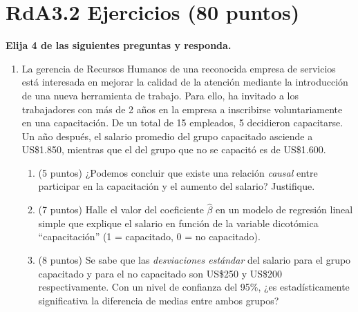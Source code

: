 \documentclass[10pt,a4paper]{article}
\begin{document}
\section{RdA3.2 Ejercicios (80 puntos)}
{\bf Elija 4 de las siguientes preguntas y responda.} 
\begin{enumerate}
  \item La gerencia de Recursos Humanos de una reconocida empresa de servicios está interesada en mejorar la calidad de la atención mediante la introducción de una nueva herramienta de trabajo. Para ello, ha invitado a los trabajadores con más de 2 años en la empresa a inscribirse voluntariamente en una capacitación. De un total de 15 empleados, 5 decidieron capacitarse. Un año después, el salario promedio del grupo capacitado asciende a US\$1.850, mientras que el del grupo que no se capacitó es de US\$1.600.
\begin{enumerate}
      \item  (5 puntos) ¿Podemos concluir que existe una relación \textit{causal} entre participar en la capacitación y el aumento del salario? Justifique.

    \item  (7 puntos) Halle el valor del coeficiente $\hat{\beta}$ en un modelo de regresión lineal simple que explique el salario en función de la variable dicotómica ``capacitación'' (1 = capacitado, 0 = no capacitado).
    \item  (8 puntos) Se sabe que las \textit{desviaciones estándar} del salario para el grupo capacitado y para el no capacitado  son  US\$250  y  US\$200 respectivamente. Con un nivel de confianza del 95\%, ¿es estadísticamente significativa la diferencia de medias entre ambos grupos?
\end{enumerate}
    






\end{enumerate}
\end{document}
